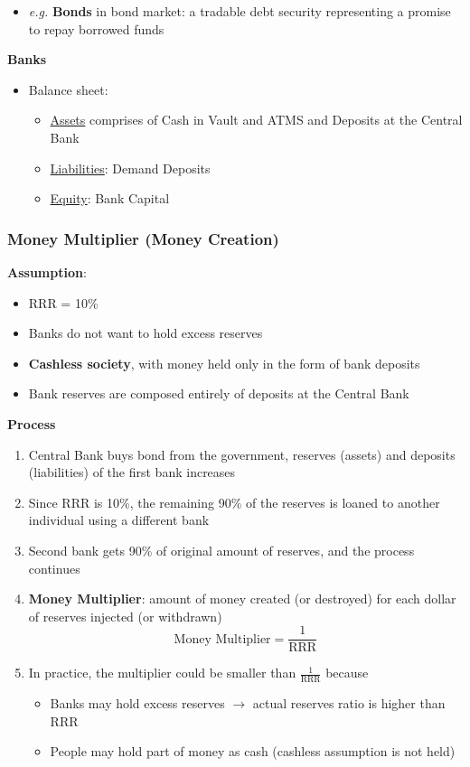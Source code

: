 \documentclass{article}
\newcommand{\eg}[0]{\textit{e.g. }}
\begin{document}
\begin{multicols}{2}
\begin{itemize}
\begin{itemize}
		\item \eg \textbf{Bonds} in bond market: a tradable debt security representing a promise to repay borrowed funds
	\end{itemize}
\end{itemize}
\textbf{Banks}
\begin{itemize}
	\item Balance sheet:
	\begin{itemize}
		\item \underline{Assets} comprises of Cash in Vault and ATMS and Deposits at the Central Bank
		\item \underline{Liabilities}: Demand Deposits
		\item \underline{Equity}: Bank Capital
	\end{itemize}
\end{itemize}


\subsubsection{Money Multiplier (Money Creation)}
\textbf{Assumption}:
\begin{itemize}
	\item RRR = 10\%
	\item Banks do not want to hold excess reserves
	\item \textbf{Cashless society}, with money held only in the form of bank deposits
	\item Bank reserves are composed entirely of deposits at the Central Bank
\end{itemize}
\textbf{Process}
\begin{enumerate}
	\item Central Bank buys bond from the government, reserves (assets) and deposits (liabilities) of the first bank increases
	\item Since RRR is 10\%, the remaining 90\% of the reserves is loaned to another individual using a different bank
	\item Second bank gets 90\% of original amount of reserves, and the process continues
	\item \textbf{Money Multiplier}: amount of money created (or destroyed) for each dollar of reserves injected (or withdrawn)
	$$\text{Money Multiplier} = \frac{1}{\text{RRR}}$$
	\item In practice, the multiplier could be smaller than $\frac{1}{\text{RRR}}$ because
	\begin{itemize}
		\item Banks may hold excess reserves $\rightarrow$ actual reserves ratio is higher than RRR
		\item People may hold part of money as cash (cashless assumption is not held)
	\end{itemize}
\end{enumerate}

\end{multicols}
\end{document}
